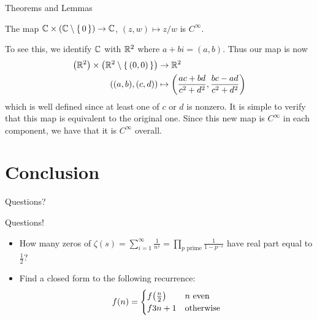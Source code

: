 \documentclass[aspectratio=169]{beamer}
\begin{document}
\begin{frame}{Theorems and Lemmas}
    \begin{lem}
        The map $\C \times \pqty{\C \setminus \set{0}} \to \C$, $(z, w) \mapsto z / w$ is $C^{\infty}$.
    \end{lem}
    \begin{pf}
        To see this, we identify $\mathbb{C}$ with $\mathbb{R}^{2}$ where $a + bi = (a, b)$.
        Thus our map is now
        \begin{align*}
            \pqty{\R^{2}} \times \pqty{\R^{2} \setminus \set{(0, 0)}} &\to \R^{2} \\
                            ((a, b), (c, d)) &\mapsto \pqty{\frac{ac + bd}{c^{2} + d^{2}}, \frac{bc - ad}{c^{2} + d^{2}}}
        \end{align*}
        which is well defined since at least one of $c$ or $d$ is nonzero.
        It is simple to verify that this map is equivalent to the original one.
        Since this new map is $C^{\infty}$ in each component, we have that it is $C^{\infty}$ overall.
    \end{pf}
\end{frame}

\section{Conclusion}
\frame{\sectionpage}

\begin{frame}{}
      \begin{center}
    {\color{sigma@mainblue} \LARGE Questions?}
  \end{center}
\end{frame}

\begin{frame}{Questions!}
    \begin{itemize}
        \item How many zeros of $\zeta(s) = \sum\limits_{i = 1}^\infty \frac{1}{n^s} = \prod\limits_{p \text{ prime}} \frac{1}{1 - p^{-s}}$ have real part equal to $\frac{1}{2}$?
        \item Find a closed form to the following recurrence:
        $$
            f(n) = \begin{cases} 
                f\pqty{\frac{n}{2}} & n \text{ even} \\
                f{3n + 1} & \text{otherwise}                
            \end{cases}
        $$
    \end{itemize}
\end{frame}
\end{document}
